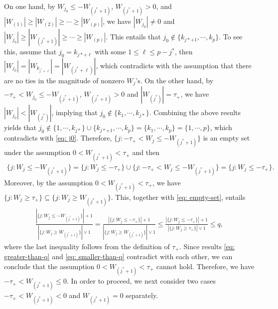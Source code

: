 \documentclass[11pt]{article}
\begin{document}
	On one hand, by $W_{j_0} \leq -W_{(j^{*}+1)}$,  $W_{(j^{*}+1)}>0$, and $|W_{(1)}|\geq |W_{(2)}|\geq \cdots\geq  |W_{(p)}|$, we have $|W_{j_0}|\neq 0$ and $|W_{j_0}| \geq |W_{(j^{*}+1)}|\geq \cdots\geq |W_{(p)}|$. This entails that $j_0\notin\{k_{j*+1}, \cdots, k_p\}$. To see this, 
	assume that $j_0=k_{j*+\ell}$ with some $1\leq \ell\leq p-j^{*}$, then $|W_{j_0}|=|W_{k_{j^*+\ell}}|=|W_{(j^*+\ell)}|$, which contradicts with the assumption that there are no ties in the magnitude of nonzero $W_j$'s. On the other hand, by $-\tau_{+} <W_{j_0} \leq -W_{(j^{*}+1)}$, $W_{(j^{*}+1)}>0$ and $|W_{(j^{*})}|=\tau_{+}$, we have $|W_{j_0}|< |W_{(j^{*})}|$, implying that $j_0\notin\{k_{1}, \cdots, k_{j*}\}$. Combining the above results yields that $j_0\notin\{1, \cdots, k_{j*}\}\cup\{k_{j*+1}, \cdots, k_p\}=\{k_1, \cdots, k_p\}=\{1, \cdots, p\}$, which contradicts with \eqref{eq: j0}. Therefore, $\{j: -\tau_{+} <W_j \leq -W_{(j^{*}+1)}\}$ is an empty set under the assumption $0<W_{(j^*+1)}<\tau_{+}$ and then
	\begin{align}\label{eq: empty-set}
	\{j: W_j \leq -W_{(j^{*}+1)}\} 
	= \{j: W_j \leq -\tau_{+}\}\cup \{j: -\tau_{+} <W_j \leq -W_{(j^{*}+1)}\}
	=\{j: W_j \leq -\tau_{+}\}.
	\end{align}
	Moreover, by the assumption $0<W_{(j^*+1)}<\tau_{+}$, we have $\{j: W_j \geq \tau_{+}\}\subseteq \{j: W_j \geq W_{(j^{*}+1)}\}$. This, together with  \eqref{eq: empty-set}, entails   
	\begin{align}\label{eq: smaller-than-q}
	\frac{|\{j: W_j \leq -W_{(j^{*}+1)}\}|+1}{|\{j: W_j \geq W_{(j^{*}+1)}\}|\vee 1}
	= \frac{|\{j: W_j \leq -\tau_{+}\}|+1}{|\{j: W_j \geq W_{(j^{*}+1)}\}|\vee 1}
	\leq \frac{|\{j: W_j \leq -\tau_{+}\}|+1}{|\{j: W_j \geq \tau_{+}\}|\vee 1}\leq q,
	\end{align}
	where the last inequality follows from the definition of $\tau_{+}$.  Since  results \eqref{eq: greater-than-q} and \eqref{eq: smaller-than-q} contradict with each other, we can conclude that the assumption $0<W_{(j^{*}+1)}<\tau_{+}$ cannot hold.  Therefore, we have $-\tau_{+}< W_{(j^{*}+1)}\leq 0$.
In order to proceed, we next consider two cases $-\tau_{+}< W_{(j^{*}+1)}< 0$ and $W_{(j^{*}+1)}=0$  separately. 
\end{document}
